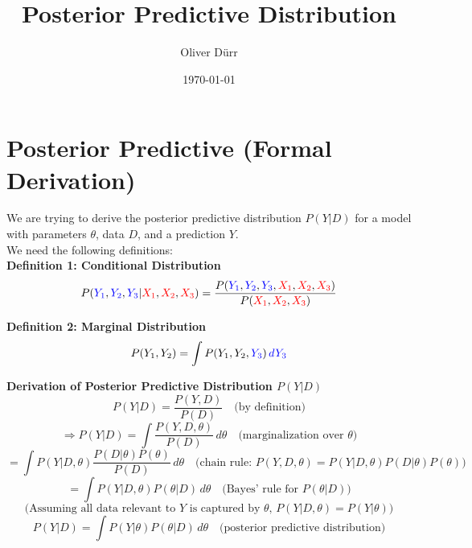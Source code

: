 \documentclass[11pt]{article}
\title{Posterior Predictive Distribution}
\author{Oliver Dürr}
\date{\today}
\begin{document}
  

\maketitle

\section*{Posterior Predictive (Formal Derivation)}
We are trying to derive the posterior predictive distribution \(P(Y | D)\) for a model with parameters \(\theta\), data \(D\), and a prediction \(Y\). \\
We need the following definitions: \\

\textbf{Definition 1: Conditional Distribution} \\

\[
P(\textcolor{blue}{Y_1}, \textcolor{blue}{Y_2}, \textcolor{blue}{Y_3} | \textcolor{red}{X_1}, \textcolor{red}{X_2}, \textcolor{red}{X_3}) = \frac{P(\textcolor{blue}{Y_1}, \textcolor{blue}{Y_2}, \textcolor{blue}{Y_3}, \textcolor{red}{X_1}, \textcolor{red}{X_2}, \textcolor{red}{X_3})}{P(\textcolor{red}{X_1}, \textcolor{red}{X_2}, \textcolor{red}{X_3})}
\]

\textbf{Definition 2: Marginal Distribution} \\

\[
P(Y_1, Y_2) = \int P(Y_1, Y_2, \textcolor{blue}{Y_3}) \, \textcolor{blue}{dY_3}
\]

\textbf{Derivation of Posterior Predictive Distribution \(P(Y | D)\)} \\
\[
P(Y | D) = \frac{P(Y, D)}{P(D)} \quad \text{(by definition)}
\]
\[
\Rightarrow P(Y | D) = \int \frac{P(Y, D, \theta)}{P(D)} \, d\theta \quad \text{(marginalization over } \theta\text{)}
\]
\[
= \int P(Y | D, \theta) \frac{P(D | \theta) P(\theta)}{P(D)} \, d\theta \quad \text{(chain rule: } P(Y, D, \theta) = P(Y | D, \theta) P(D | \theta) P(\theta)\text{)}
\]
\[
= \int P(Y | D, \theta) P(\theta | D) \, d\theta \quad \text{(Bayes' rule for } P(\theta|D)\text{)}
\]
\[
\text{(Assuming all data relevant to } Y \text{ is captured by } \theta\text{, } P(Y | D, \theta) = P(Y | \theta)\text{)}
\]
\[
P(Y | D) = \int P(Y | \theta) P(\theta | D) \, d\theta \quad \text{(posterior predictive distribution)}
\]
\end{document}
